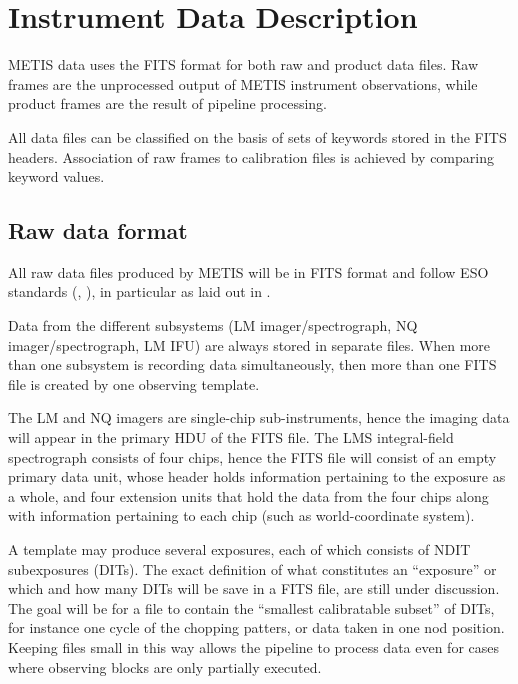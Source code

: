 
\clearpage
\section{Instrument Data Description}
\label{sec:instrument_data_description}

METIS data uses the FITS format for both raw and product data
files. Raw frames are the unprocessed output of METIS instrument
observations, while product frames are the result of pipeline
processing.

All data files can be classified on the basis of sets of keywords
stored in the FITS headers. Association of raw frames to calibration
files is achieved by comparing keyword values.


\subsection{Raw data format}
\label{ssec:instrument_data_format}

All raw data files produced by METIS will be in FITS format and follow
ESO standards (, ), in particular as
laid out in \cite{ESO-DICD}.

Data from the different subsystems (LM imager/spectrograph, NQ
imager/spectrograph, LM IFU) are always stored in separate files.
When more than one subsystem is recording data simultaneously, then
more than one FITS file is created by one observing template.

The LM and NQ imagers are single-chip sub-instruments, hence the
imaging data will appear in the primary HDU of the FITS file. The LMS
integral-field spectrograph consists of four chips, hence the FITS
file will consist of an empty primary data unit, whose header holds
information pertaining to the exposure as a whole, and four extension
units that hold the data from the four chips along with information
pertaining to each chip (such as world-coordinate system).

A template may produce several exposures, each of which consists of
NDIT subexposures (DITs). The exact definition of what constitutes an
``exposure'' or which and how many DITs will be save in a FITS file,
are still under discussion. The goal will be for a file to contain the
``smallest calibratable subset'' of DITs, for instance one cycle of
the chopping patters, or data taken in one nod position. Keeping files
small in this way allows the pipeline to process data even for cases
where observing blocks are only partially executed.

